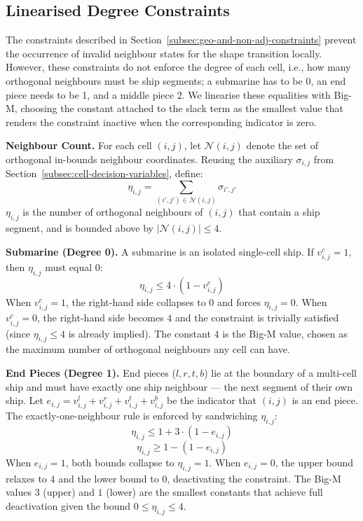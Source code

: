 \subsection{Linearised Degree Constraints}\label{subsec:degree-constraints}
The constraints described in Section~\ref{subsec:geo-and-non-adj-constraints} prevent the occurrence of invalid neighbour states for the shape transition locally. However, these constraints do not enforce the degree of each cell, i.e., how many orthogonal neighbours must be ship segments; a submarine has to be 0, an end piece needs to be 1, and a middle piece 2. We linearise these equalities with Big-M, choosing the constant attached to the slack term as the smallest value that renders the constraint inactive when the corresponding indicator is zero.

\textbf{Neighbour Count.}
For each cell $(i, j)$, let $\mathcal{N}(i, j)$ denote the set of orthogonal in-bounds neighbour coordinates. Reusing the auxiliary $\sigma_{i,j}$ from Section~\ref{subsec:cell-decision-variables}, define:
\begin{equation}\label{eq:cell-eta-def}
    \eta_{i,j} = \sum_{(i', j') \in \mathcal{N}(i,j)} \sigma_{i', j'}
\end{equation}
$\eta_{i,j}$ is the number of orthogonal neighbours of $(i, j)$ that contain a ship segment, and is bounded above by $|\mathcal{N}(i, j)| \leq 4$.

\textbf{Submarine (Degree 0).}
A submarine is an isolated single-cell ship. If $v_{i,j}^c = 1$, then $\eta_{i,j}$ must equal $0$:
\begin{equation}\label{eq:cell-degree-sub}
    \eta_{i,j} \leq 4 \cdot (1 - v_{i,j}^c)
\end{equation}
When $v_{i,j}^c = 1$, the right-hand side collapses to $0$ and forces $\eta_{i,j} = 0$. When $v_{i,j}^c = 0$, the right-hand side becomes $4$ and the constraint is trivially satisfied (since $\eta_{i,j} \leq 4$ is already implied). The constant $4$ is the Big-M value, chosen as the maximum number of orthogonal neighbours any cell can have.

\textbf{End Pieces (Degree 1).}
End pieces ($l, r, t, b$) lie at the boundary of a multi-cell ship and must have exactly one ship neighbour --- the next segment of their own ship. Let $e_{i,j} = v_{i,j}^l + v_{i,j}^r + v_{i,j}^t + v_{i,j}^b$ be the indicator that $(i, j)$ is an end piece. The exactly-one-neighbour rule is enforced by sandwiching $\eta_{i,j}$:
\begin{equation}
    \eta_{i,j} \leq 1 + 3 \cdot (1 - e_{i,j})
\end{equation}
\begin{equation}
    \eta_{i,j} \geq 1 - (1 - e_{i,j})
\end{equation}
When $e_{i,j} = 1$, both bounds collapse to $\eta_{i,j} = 1$. When $e_{i,j} = 0$, the upper bound relaxes to $4$ and the lower bound to $0$, deactivating the constraint. The Big-M values $3$ (upper) and $1$ (lower) are the smallest constants that achieve full deactivation given the bound $0 \leq \eta_{i,j} \leq 4$.


